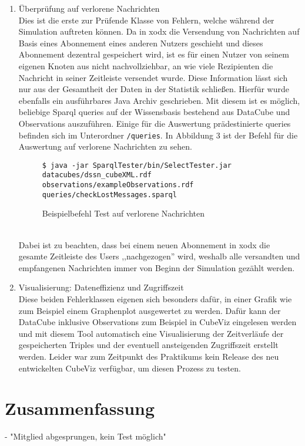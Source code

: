 \documentclass{article}
\begin{document}
\begin{enumerate}
{	}
	\item{Überprüfung auf verlorene Nachrichten\\
	Dies ist die erste zur Prüfende Klasse von Fehlern, welche während der Simulation auftreten können. Da in xodx die Versendung von Nachrichten auf Basis eines Abonnement eines anderen Nutzers geschieht und dieses Abonnement dezentral gespeichert wird, ist es für einen Nutzer von seinem eigenen Knoten aus nicht nachvollziehbar, an wie viele Rezipienten die Nachricht in seiner Zeitleiste versendet wurde. Diese Information lässt sich nur aus der Gesamtheit der Daten in der Statistik schließen. Hierfür wurde ebenfalls ein ausführbares Java Archiv geschrieben. Mit diesem ist es möglich, beliebige Sparql queries auf der Wissensbasis bestehend aus DataCube und Observations auszuführen. Einige für die Auswertung prädestinierte queries befinden sich im Unterordner \texttt{/queries}. In Abbildung 3 ist der Befehl für die Auswertung auf verlorene Nachrichten zu sehen.
	\begin{figure}[h]
	\centering
	\texttt{\$ java -jar SparqlTester/bin/SelectTester.jar datacubes/dssn\_cubeXML.rdf observations/exampleObservations.rdf queries/checkLostMessages.sparql}
	\caption{Beispielbefehl Test auf verlorene Nachrichten}
	\end{figure}\\
	Dabei ist zu beachten, dass bei einem neuen Abonnement in xodx die gesamte Zeitleiste des Users ,,nachgezogen'' wird, weshalb alle versandten und empfangenen Nachrichten immer von Beginn der Simulation gezählt werden.
	}
	\item{Visualisierung: Dateneffizienz und Zugriffszeit\\
	Diese beiden Fehlerklassen eigenen sich besonders dafür, in einer Grafik wie zum Beispiel einem Graphenplot ausgewertet zu werden. Dafür kann der DataCube inklusive Observations zum Beispiel in CubeViz eingelesen werden und mit diesem Tool automatisch eine Visualisierung der Zeitverläufe der gespeicherten Triples und der eventuell ansteigenden Zugriffszeit erstellt werden. Leider war zum Zeitpunkt des Praktikums kein Release des neu entwickelten CubeViz verfügbar, um diesen Prozess zu testen.	
	}
\end{enumerate}

\section{Zusammenfassung}

- "Mitglied abgesprungen, kein Test möglich"



\end{document}
